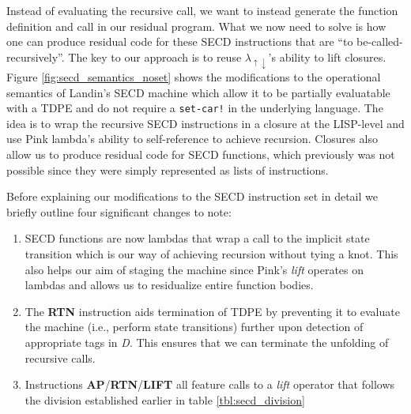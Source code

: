 \documentclass[a4paper,12pt,twoside,openright]{report}
\theoremstyle{definition}
\newcommand{\mslang}{$\lambda_{\uparrow\downarrow}$}
\begin{document}
Instead of evaluating the recursive call, we want to instead generate the function definition and call in our residual program. What we now need to solve is how one can produce residual code for these SECD instructions that are ``to be-called-recursively''. The key to our approach is to reuse \mslang's ability to lift closures. Figure \ref{fig:secd_semantics_noset} shows the modifications to the operational semantics of Landin's SECD machine \cite{landin1964mechanical} which allow it to be partially evaluatable with a TDPE and do not require a \texttt{set-car!} in the underlying language. The idea is to wrap the recursive SECD instructions in a closure at the LISP-level and use Pink lambda's ability to self-reference to achieve recursion. Closures also allow us to produce residual code for SECD functions, which previously was not possible since they were simply represented as lists of instructions.

Before explaining our modifications to the SECD instruction set in detail we briefly outline four significant changes to note:
\begin{enumerate}
    \item SECD functions are now lambdas that wrap a call to the implicit state transition which is our way of achieving recursion without tying a knot. This also helps our aim of staging the machine since Pink's \textit{lift} operates on lambdas and allows us to residualize entire function bodies.
    \item The \textbf{RTN} instruction aids termination of TDPE by preventing it to evaluate the machine (i.e., perform state transitions) further upon detection of appropriate tags in \textit{D}. This ensures that we can terminate the unfolding of recursive calls.
    \item Instructions \textbf{AP}/\textbf{RTN}/\textbf{LIFT} all feature calls to a \textit{lift} operator that follows the division established earlier in table \ref{tbl:secd_division}
\end{enumerate}
\end{document}
